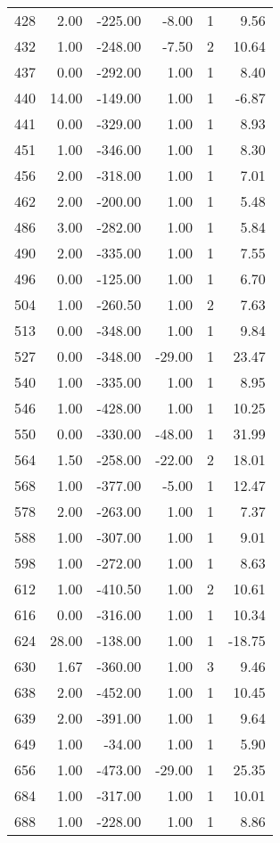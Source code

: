 \begin{appendices}
\begin{longtable}[c]{@{}rrrrrr@{}}
428 & 2.00 & -225.00 & -8.00 & 1 & 9.56 \\
432 & 1.00 & -248.00 & -7.50 & 2 & 10.64 \\
437 & 0.00 & -292.00 & 1.00 & 1 & 8.40 \\
440 & 14.00 & -149.00 & 1.00 & 1 & -6.87 \\
441 & 0.00 & -329.00 & 1.00 & 1 & 8.93 \\
451 & 1.00 & -346.00 & 1.00 & 1 & 8.30 \\
456 & 2.00 & -318.00 & 1.00 & 1 & 7.01 \\
462 & 2.00 & -200.00 & 1.00 & 1 & 5.48 \\
486 & 3.00 & -282.00 & 1.00 & 1 & 5.84 \\
490 & 2.00 & -335.00 & 1.00 & 1 & 7.55 \\
496 & 0.00 & -125.00 & 1.00 & 1 & 6.70 \\
504 & 1.00 & -260.50 & 1.00 & 2 & 7.63 \\
513 & 0.00 & -348.00 & 1.00 & 1 & 9.84 \\
527 & 0.00 & -348.00 & -29.00 & 1 & 23.47 \\
540 & 1.00 & -335.00 & 1.00 & 1 & 8.95 \\
546 & 1.00 & -428.00 & 1.00 & 1 & 10.25 \\
550 & 0.00 & -330.00 & -48.00 & 1 & 31.99 \\
564 & 1.50 & -258.00 & -22.00 & 2 & 18.01 \\
568 & 1.00 & -377.00 & -5.00 & 1 & 12.47 \\
578 & 2.00 & -263.00 & 1.00 & 1 & 7.37 \\
588 & 1.00 & -307.00 & 1.00 & 1 & 9.01 \\
598 & 1.00 & -272.00 & 1.00 & 1 & 8.63 \\
612 & 1.00 & -410.50 & 1.00 & 2 & 10.61 \\
616 & 0.00 & -316.00 & 1.00 & 1 & 10.34 \\
624 & 28.00 & -138.00 & 1.00 & 1 & -18.75 \\
630 & 1.67 & -360.00 & 1.00 & 3 & 9.46 \\
638 & 2.00 & -452.00 & 1.00 & 1 & 10.45 \\
639 & 2.00 & -391.00 & 1.00 & 1 & 9.64 \\
649 & 1.00 & -34.00 & 1.00 & 1 & 5.90 \\
656 & 1.00 & -473.00 & -29.00 & 1 & 25.35 \\
684 & 1.00 & -317.00 & 1.00 & 1 & 10.01 \\
688 & 1.00 & -228.00 & 1.00 & 1 & 8.86 \\

\end{longtable}
\end{appendices}
